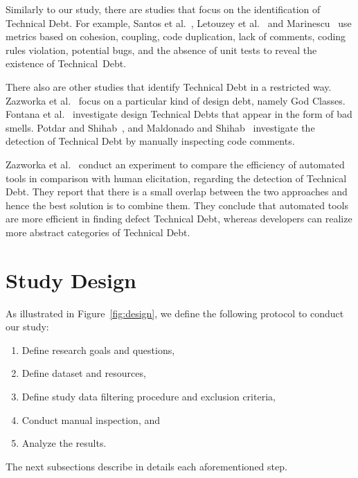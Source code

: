 \documentclass{sig-alternate}
\begin{document}
Similarly to our study, there are studies that focus on the identification of Technical Debt. For example, Santos et al.~\cite{16}, Letouzey et al.~\cite{11} and Marinescu~\cite{13} use metrics based on cohesion, coupling, code duplication, lack of comments, coding rules violation, potential bugs, and the absence of unit tests to reveal the existence of Technical~Debt.

There also are other studies that identify Technical Debt in a restricted way. 
Zazworka et al.~\cite{17} focus on a particular kind of design debt, namely God Classes.
Fontana et al.~\cite{6} investigate design Technical Debts that appear in the form of bad smells. 
Potdar and Shihab~\cite{14}, and Maldonado and Shihab~\cite{12} investigate the detection of Technical Debt by manually inspecting code comments. 

Zazworka et al.~\cite{4} conduct an experiment to compare the efficiency of automated tools in comparison with human elicitation, regarding the detection of Technical Debt.
%
They report that there is a small overlap between the two approaches and hence the best solution is to combine them. 
%
They conclude that automated tools are more efficient in finding defect Technical Debt, whereas developers can realize more abstract categories of Technical Debt.

\section{Study Design}
\label{sec:studydesign}

As illustrated in Figure~\ref{fig:design}, we define the following protocol to conduct our study:
\begin{enumerate}[~~~(a)]
\item Define research goals and questions, 
\item Define dataset and resources, 
\item Define study data filtering procedure and exclusion criteria,
\item Conduct manual inspection, and 
\item Analyze the results.
\end{enumerate}


The next subsections describe in details each aforementioned step.
\end{document}
